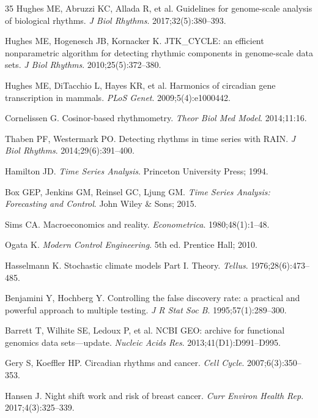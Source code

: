 \documentclass[11pt,letterpaper]{article}
\begin{document}
\begin{thebibliography}{35}
Hughes ME, Abruzzi KC, Allada R, et al.
Guidelines for genome-scale analysis of biological rhythms.
\textit{J Biol Rhythms}. 2017;32(5):380--393.

Hughes ME, Hogenesch JB, Kornacker K.
JTK\_CYCLE: an efficient nonparametric algorithm for detecting rhythmic components in genome-scale data sets.
\textit{J Biol Rhythms}. 2010;25(5):372--380.

Hughes ME, DiTacchio L, Hayes KR, et al.
Harmonics of circadian gene transcription in mammals.
\textit{PLoS Genet}. 2009;5(4):e1000442.

Cornelissen G.
Cosinor-based rhythmometry.
\textit{Theor Biol Med Model}. 2014;11:16.

Thaben PF, Westermark PO.
Detecting rhythms in time series with RAIN.
\textit{J Biol Rhythms}. 2014;29(6):391--400.

Hamilton JD.
\textit{Time Series Analysis}. Princeton University Press; 1994.

Box GEP, Jenkins GM, Reinsel GC, Ljung GM.
\textit{Time Series Analysis: Forecasting and Control}. John Wiley \& Sons; 2015.

Sims CA.
Macroeconomics and reality.
\textit{Econometrica}. 1980;48(1):1--48.

Ogata K.
\textit{Modern Control Engineering}. 5th ed. Prentice Hall; 2010.

Hasselmann K.
Stochastic climate models Part I. Theory.
\textit{Tellus}. 1976;28(6):473--485.

Benjamini Y, Hochberg Y.
Controlling the false discovery rate: a practical and powerful approach to multiple testing.
\textit{J R Stat Soc B}. 1995;57(1):289--300.

Barrett T, Wilhite SE, Ledoux P, et al.
NCBI GEO: archive for functional genomics data sets---update.
\textit{Nucleic Acids Res}. 2013;41(D1):D991--D995.

Gery S, Koeffler HP.
Circadian rhythms and cancer.
\textit{Cell Cycle}. 2007;6(3):350--353.

Hansen J.
Night shift work and risk of breast cancer.
\textit{Curr Environ Health Rep}. 2017;4(3):325--339.


\end{thebibliography}
\end{document}
